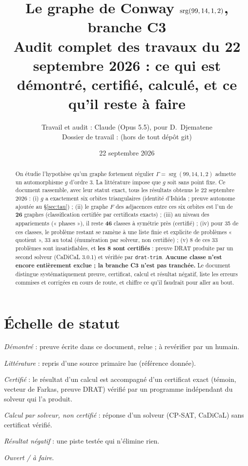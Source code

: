 \documentclass[11pt,a4paper]{article}
\title{Le graphe de Conway $\srg(99,14,1,2)$, branche C3\\
\large Audit complet des travaux du 22 septembre 2026 : ce qui est démontré, certifié, calculé, et ce qu'il reste à faire}
\author{Travail et audit : Claude (Opus 5.5), pour D.~Djematene\\
\small Dossier de travail : \code{Desktop/c3\_recherche\_annexe} (hors de tout dépôt git)}
\date{22 septembre 2026}
\theoremstyle{remark}
\newcommand{\srg}{\operatorname{srg}}
\newcommand{\st}[1]{\textbf{[#1]}}
\newcommand{\code}[1]{\texttt{#1}}
\begin{document}
\maketitle

\begin{abstract}
On étudie l'hypothèse qu'un graphe fortement régulier $\Gamma=\srg(99,14,1,2)$ admette un automorphisme $g$ d'ordre $3$.
La littérature impose que $g$ soit sans point fixe. Ce document rassemble, avec leur statut exact, tous les résultats obtenus le 22 septembre 2026 :
(i) $g$ a exactement six orbites triangulaires (identité d'Ishida ; preuve autonome ajoutée au §\ref{sec:tau}) ;
(ii) le graphe $F$ des adjacences entre ces six orbites est l'un de \textbf{26} graphes (classification certifiée par certificats exacts) ;
(iii) au niveau des appariements (« phases »), il reste \textbf{46} classes à symétrie près (certifié) ;
(iv) pour 35 de ces classes, le problème restant se ramène à une liste finie et explicite de problèmes « quotient », 33 au total (énumération par solveur, non certifiée) ;
(v) 8 de ces 33 problèmes sont insatisfiables, et \textbf{les 8 sont certifiés} : preuve DRAT produite par un second solveur (CaDiCaL 3.0.1)
et vérifiée par \code{drat-trim}.
\textbf{Aucune classe n'est encore entièrement exclue ; la branche C3 n'est pas tranchée.}
Le document distingue systématiquement preuve, certificat, calcul et résultat négatif, liste les erreurs commises et corrigées en cours de route,
et chiffre ce qu'il faudrait pour aller au bout.
\end{abstract}

\tableofcontents

\section*{Échelle de statut}
\begin{description}[nosep]
\item[\st{D}] \emph{Démontré} : preuve écrite dans ce document, relue ; à revérifier par un humain.
\item[\st{L}] \emph{Littérature} : repris d'une source primaire lue (référence donnée).
\item[\st{C}] \emph{Certifié} : le résultat d'un calcul est accompagné d'un certificat exact (témoin, vecteur de Farkas, preuve DRAT) vérifié par un programme
indépendant du solveur qui l'a produit.
\item[\st{S}] \emph{Calcul par solveur, non certifié} : réponse d'un solveur (CP-SAT, CaDiCaL) sans certificat vérifié.
\item[\st{N}] \emph{Résultat négatif} : une piste testée qui n'élimine rien.
\item[\st{?}] \emph{Ouvert / à faire}.
\end{description}
\end{document}
